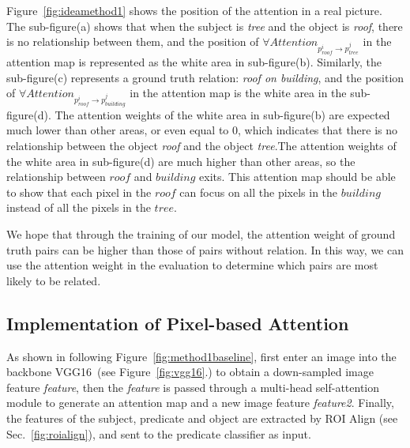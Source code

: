 Figure~\ref{fig:ideamethod1} shows the position of the attention in a real picture. The sub-figure(a) shows that when the subject is \textit{tree} and the object is \textit{roof}, there is no relationship between them, and the position of $ \forall Attention_{p^i_{roof} \to p^j_{tree}}  $ in the attention map is represented as the white area in sub-figure(b). Similarly, the sub-figure(c) represents a ground truth relation: \textit{roof on building}, and the position of $ \forall Attention_{p^i_{roof} \to p^j_{building}}  $ in the attention map is the white area in the sub-figure(d). The attention weights of the white area in sub-figure(b) are expected much lower than other areas, or even equal to 0, which indicates that there is no relationship between the object \textit{roof} and the object \textit{tree}.The attention weights of the white area in sub-figure(d) are much higher than other areas, so the relationship between $ roof $ and $ building $ exits. This attention map should be able to show that each pixel in the $ roof $ can focus on all the pixels in the $ building $ instead of all the pixels in the $ tree $.




We hope that through the training of our model, the attention weight of ground truth pairs can be higher than those of pairs without relation. In this way, we can use the attention weight in the evaluation to determine which pairs are most likely to be related.


\subsection{ Implementation of Pixel-based Attention}
As shown in following Figure~\ref{fig:method1baseline}, first enter an image into the  backbone VGG16~\cite{simonyan2015deep}(see Figure~\ref{fig:vgg16}.) to obtain a down-sampled image feature \textit{feature},  then the \textit{feature} is passed through a multi-head self-attention module to generate an attention map and a new image feature \textit{feature2}. Finally, the features of the subject, predicate and object are extracted by ROI Align (see  Sec.~\ref{fig:roialign}), and sent to the predicate classifier as input.


